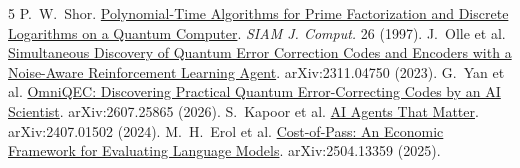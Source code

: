 \documentclass[11pt]{article}
\begin{document}
\begingroup
\renewcommand{\section}[2]{}%
\fontsize{8.1}{9.2}\selectfont
\setlength{\parskip}{0pt}
\begin{thebibliography}{5}
\setlength{\itemsep}{0pt}\setlength{\parsep}{0pt}\setlength{\parskip}{0pt}
 P.~W.~Shor. \href{https://arxiv.org/abs/quant-ph/9508027}{Polynomial-Time Algorithms for Prime Factorization and Discrete Logarithms on a Quantum Computer}. \emph{SIAM J. Comput.} 26 (1997).
 J.~Olle et al. \href{https://arxiv.org/abs/2311.04750}{Simultaneous Discovery of Quantum Error Correction Codes and Encoders with a Noise-Aware Reinforcement Learning Agent}. arXiv:2311.04750 (2023).
 G.~Yan et al. \href{https://arxiv.org/abs/2607.25865}{OmniQEC: Discovering Practical Quantum Error-Correcting Codes by an AI Scientist}. arXiv:2607.25865 (2026).
 S.~Kapoor et al. \href{https://arxiv.org/abs/2407.01502}{AI Agents That Matter}. arXiv:2407.01502 (2024).
 M.~H.~Erol et al. \href{https://arxiv.org/abs/2504.13359}{Cost-of-Pass: An Economic Framework for Evaluating Language Models}. arXiv:2504.13359 (2025).
\end{thebibliography}
\endgroup
\end{document}

